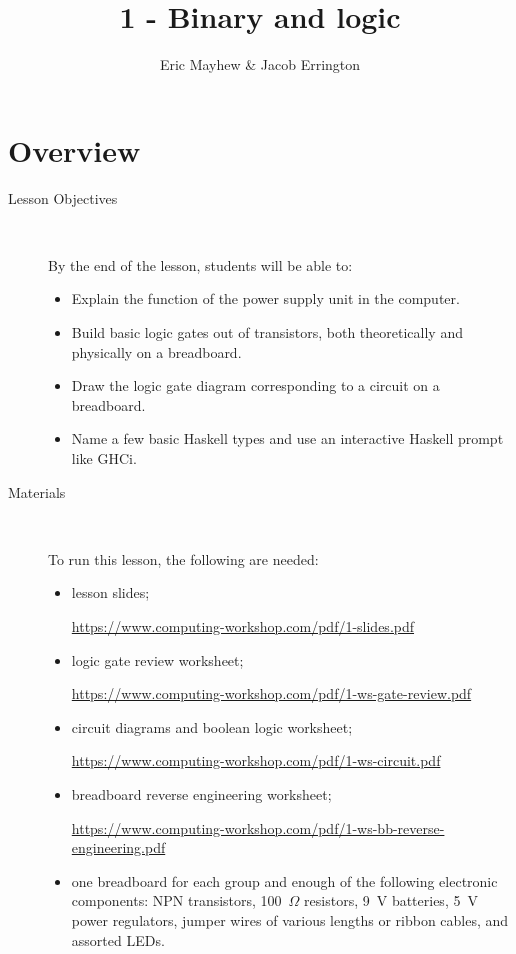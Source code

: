 \documentclass[11pt]{article}
\title{1 - Binary and logic}
\author{Eric Mayhew \& Jacob Errington}
\date{}
\newcommand{\cwurl}{https://www.computing-workshop.com/}
\newcommand{\cwpdf}{\cwurl pdf/}
\begin{document}
\maketitle

\section*{Overview}

\begin{description}
  \item[Lesson Objectives] ~

   By the end of the lesson, students will be able to:

  \begin{itemize}
    \item Explain the function of the power supply unit in the computer.

    \item Build basic logic gates out of transistors, both theoretically and
      physically on a breadboard.

    \item Draw the logic gate diagram corresponding to a circuit on a
      breadboard.

    \item Name a few basic Haskell types and use an interactive Haskell prompt
      like GHCi.
  \end{itemize}

  \item [Materials]~

    To run this lesson, the following are needed:

    \begin{itemize}
      \item
        lesson slides;

        \url{\cwpdf 1-slides.pdf}

      \item
        logic gate review worksheet;

        \url{\cwpdf 1-ws-gate-review.pdf}

      \item
        circuit diagrams and boolean logic worksheet;

        \url{\cwpdf 1-ws-circuit.pdf}

      \item
        breadboard reverse engineering worksheet;

        \url{\cwpdf 1-ws-bb-reverse-engineering.pdf}

      \item
        one breadboard for each group and enough of the following electronic
        components:
        NPN transistors,
        100~$\Omega$ resistors,
        9~V batteries,
        5~V power regulators,
        jumper wires of various lengths or ribbon cables,
        and assorted LEDs.

    \end{itemize}
\end{description}
\end{document}

